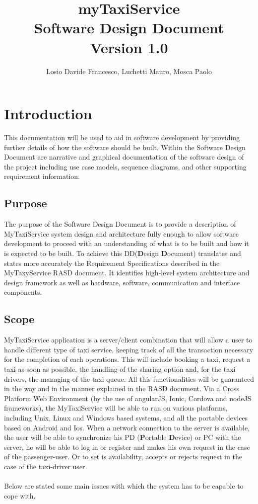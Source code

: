 \documentclass[10pt,a4paper]{report}
\author{Losio Davide Francesco, Luchetti Mauro, Mosca Paolo}
\title{myTaxiService\\Software Design Document\\ Version 1.0}
\begin{document}
\maketitle
\tableofcontents
\chapter{Introduction}
This documentation will be used to aid in software development by providing further details of how the software should be built. Within the Software Design Document are narrative and graphical documentation of the software design of the project including use case models, sequence diagrams, and other supporting requirement information.

\section{Purpose}

The purpose of the Software Design Document is to provide a description of MyTaxiService system design and architecture fully enough to allow software development to proceed with an understanding of what is to be built and how it is expected to be built. To achieve this DD(\textbf{D}esign \textbf{D}ocument) translates and states more accurately the Requirement Specifications described in the MyTaxyService RASD document. It identifies high-level system architecture and design framework as well as hardware, software, communication and interface components.

\section{Scope}

MyTaxiService application is a server/client combination that will allow a user to handle different type of taxi service, keeping track of all the transaction necessary for the completion of each operations. This will include booking a taxi, request a taxi as soon as possible, the handling of the sharing option and, for the taxi drivers, the managing of the taxi queue. All this functionalities will be guaranteed in the way and in the manner explained in the RASD document. Via a Cross Platform Web Environment (by the use of angularJS, Ionic, Cordova and nodeJS frameworks), the MyTaxiService will be able to run on various platforms, including Unix, Linux and Windows based systems, and all the portable devices based on Android and Ios. When a network connection to the server is available, the user will be able to synchronize his PD (\textbf{P}ortable \textbf{D}evice) or PC with the server, he will be able to log in or register and makes his own request in the case of the passenger-user. Or to set is availability, accepts or rejects request in the case of the taxi-driver user.\\\\
Below are stated some main issues with which the system has to be capable to cope with.
\end{document}
